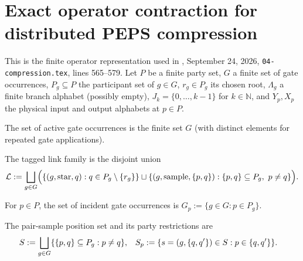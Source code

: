 \section{Exact operator contraction for distributed PEPS compression}
\label{sec:peps_distributed_operator}
This is the finite operator representation used in
\cite[Theorem~5.2]{OpenAI2026PolynomialPEPS}, September 24, 2026,
\texttt{04-compression.tex}, lines 565--579.
Let $P$ be a finite party set, $G$ a finite set of gate occurrences,
$P_g\subseteq P$ the participant set of $g\in G$, $r_g\in P_g$ its chosen root,
$\Lambda_g$ a finite branch alphabet (possibly empty), $J_k=\{0,\ldots,k-1\}$ for $k\in\mathbb N$,
and $Y_p,X_p$ the physical input and output alphabets at $p\in P$.

\begin{definition}
    \label{def:compression_operator_active_gates}
    \leanok
    The set of active gate occurrences is the finite set $G$ (with distinct elements for repeated gate applications).
\end{definition}

\begin{definition}
    \label{def:compression_operator_links}
    \leanok
    The tagged link family is the disjoint union
    \begin{align}
        \mathcal L := \bigsqcup_{g\in G}\Bigl(\{(g,\mathrm{star},q):q\in P_g\setminus\{r_g\}\}\sqcup\{(g,\mathrm{sample},\{p,q\}):\{p,q\}\subseteq P_g,\ p\ne q\}\Bigr). \notag
    \end{align}
\end{definition}

\begin{definition}
    \label{def:compression_operator_party_gates}
    \leanok
    For $p\in P$, the set of incident gate occurrences is $G_p:=\{g\in G:p\in P_g\}$.
\end{definition}

\begin{definition}
    \label{def:compression_operator_samples}
    \leanok
    The pair-sample position set and its party restrictions are
    \begin{align}
        S   & := \bigsqcup_{g\in G}\{\{p,q\}\subseteq P_g:p\ne q\}, &
        S_p & := \{s=(g,\{q,q'\})\in S:p\in\{q,q'\}\}. \notag
    \end{align}
\end{definition}

